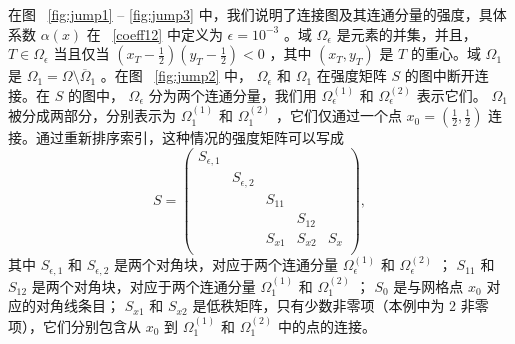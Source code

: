\documentclass[12pt]{acta_2011xz}
\begin{document}
在图~    \ref{fig:jump1}    --    \ref{fig:jump3}    中，我们说明了连接图及其连通分量的强度，具体系数    $\alpha(x)$    在~    \eqref{coeff12}    中定义为
   $\epsilon=10^{-3}$    。域    $\Omega_\epsilon$    是元素的并集，并且，   $T\in \Omega_\epsilon$    当且仅当
   $(x_T-\frac12)(y_T-\frac12) < 0$    ，其中    $(x_T,y_T)$    是    $T$    的重心。域    $\Omega_1$    是
   $\Omega_1 = \Omega\setminus\overline{\Omega}_1$    。在图~    \ref{fig:jump2}    中，   $\Omega_\epsilon$    和    $\Omega_1$    在强度矩阵    $S$    的图中断开连接。在
   $S$    的图中，   $\Omega_\epsilon$    分为两个连通分量，我们用    $\Omega_\epsilon^{(1)}$    和
   $\Omega_\epsilon^{(2)}$    表示它们。    $\Omega_1$    被分成两部分，分别表示为    $\Omega_1^{(1)}$    和    $\Omega_1^{(2)}$    ，它们仅通过一个点    $x_0=(\frac{1}{2}, \frac{1}{2})$    连接。通过重新排序索引，这种情况的强度矩阵可以写成
   \begin{equation*}
S = \begin{pmatrix}
    S_{\epsilon,1} & & &  \\ 
    & S_{\epsilon,2} & & & \\ 
    & & S_{11} & & \\ 
    & & & S_{12} &  \\ 
    & & S_{x1} & S_{x2} &S_{x} \\ 
\end{pmatrix},
\end{equation*}    其中    $S_{\epsilon,1}$    和    $S_{\epsilon,2}$    是两个对角块，对应于两个连通分量    $\Omega_\epsilon^{(1)}$    和
   $\Omega_\epsilon^{(2)}$    ；    $S_{11}$    和    $S_{12}$    是两个对角块，对应于两个连通分量    $\Omega_1^{(1)}$    和
   $\Omega_1^{(2)}$    ；    $S_0$    是与网格点    $x_0$    对应的对角线条目；    $S_{x1}$    和    $S_{x2}$    是低秩矩阵，只有少数非零项（本例中为    $2$    非零项），它们分别包含从    $x_0$    到    $\Omega_1^{(1)}$    和
   $\Omega_1^{(2)}$    中的点的连接。
\end{document}
